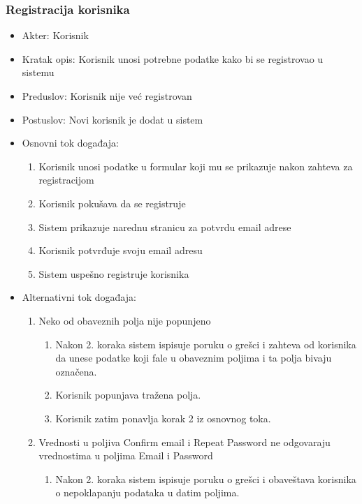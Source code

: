 \documentclass[a4paper]{article}
\begin{document}
\subsubsection{Registracija korisnika}
\label{subsubsection:registracijakorisnikasec}
\begin{itemize}
    \item Akter: Korisnik
    \item Kratak opis: Korisnik unosi potrebne podatke kako bi se registrovao u sistemu
    \item Preduslov: Korisnik nije već registrovan
    \item Postuslov: Novi korisnik je dodat u sistem
    \item Osnovni tok događaja:
        \begin{enumerate}
            \item Korisnik unosi podatke u formular koji mu se prikazuje nakon zahteva za registracijom
            \item Korisnik pokušava da se registruje
            \item Sistem prikazuje narednu stranicu za potvrdu email adrese
            \item Korisnik potvrđuje svoju email adresu
            \item Sistem uspešno registruje korisnika
        \end{enumerate}
    \item Alternativni tok događaja:
        \begin{enumerate}
            \item Neko od obaveznih polja nije popunjeno
                \begin{enumerate}
                    \item Nakon 2. koraka sistem ispisuje poruku o grešci i zahteva od korisnika da unese podatke koji fale u obaveznim poljima i ta polja bivaju označena.
                    \item Korisnik popunjava tražena polja.
                    \item Korisnik zatim ponavlja korak 2 iz osnovnog toka.
                \end{enumerate}
            \item Vrednosti u poljiva Confirm email i Repeat Password ne odgovaraju vrednostima u poljima Email i Password
                \begin{enumerate}
                    \item Nakon 2. koraka sistem ispisuje poruku o grešci i obaveštava korisnika o nepoklapanju podataka u datim poljima.

\end{enumerate}
\end{enumerate}
\end{itemize}
\end{document}
